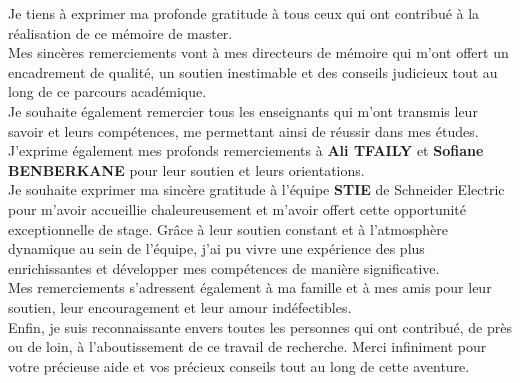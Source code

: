 
Je tiens à exprimer ma profonde gratitude à tous ceux qui ont contribué à la
réalisation de ce mémoire de master.\\

Mes sincères remerciements vont à mes directeurs de mémoire qui m'ont offert un
encadrement de qualité, un soutien inestimable et des conseils judicieux tout
au long de ce parcours académique.\\

Je souhaite également remercier tous les enseignants qui m'ont transmis leur
savoir et leurs compétences, me permettant ainsi de réussir dans mes études.\\

J'exprime également mes profonds remerciements à \textbf{Ali TFAILY} et
\textbf{Sofiane BENBERKANE} pour leur soutien et leurs orientations.\\

Je souhaite exprimer ma sincère gratitude à l'équipe \textbf{STIE} de Schneider
Electric pour m'avoir accueillie chaleureusement et m'avoir offert cette
opportunité exceptionnelle de stage. Grâce à leur soutien constant et à
l'atmosphère dynamique au sein de l'équipe, j'ai pu vivre une expérience des
plus enrichissantes et développer mes compétences de manière significative.\\

Mes remerciements s'adressent également à ma famille et à mes amis pour leur
soutien, leur encouragement et leur amour indéfectibles.\\

Enfin, je suis reconnaissante envers toutes les personnes qui ont contribué, de
près ou de loin, à l'aboutissement de ce travail de recherche. Merci infiniment
pour votre précieuse aide et vos précieux conseils tout au long de cette
aventure.

\clearpage